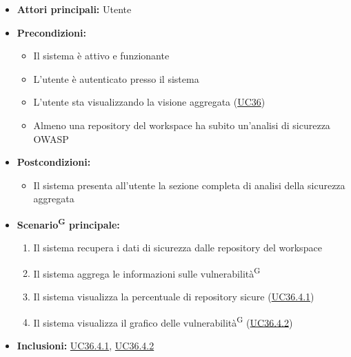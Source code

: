 \documentclass[a4paper, 11pt]{article}
\begin{document}
\begin{itemize}
    \item \textbf{Attori principali:} Utente
    \item \textbf{Precondizioni:}
    \begin{itemize}
        \item Il sistema è attivo e funzionante
        \item L'utente è autenticato presso il sistema
        \item L'utente sta visualizzando la visione aggregata (\hyperref[UC36]{UC36})
        \item Almeno una repository del workspace ha subito un'analisi di sicurezza OWASP
    \end{itemize}
    \item \textbf{Postcondizioni:}
    \begin{itemize}
        \item Il sistema presenta all'utente la sezione completa di analisi della sicurezza aggregata
    \end{itemize}
    \item \textbf{Scenario\textsuperscript{G} principale:}
    \begin{enumerate}
        \item Il sistema recupera i dati di sicurezza dalle repository del workspace
        \item Il sistema aggrega le informazioni sulle vulnerabilità\textsuperscript{G}
        \item Il sistema visualizza la percentuale di repository sicure (\hyperref[UC36.4.1]{UC36.4.1})
        \item Il sistema visualizza il grafico delle vulnerabilità\textsuperscript{G} (\hyperref[UC36.4.2]{UC36.4.2})
    \end{enumerate}
    \item \textbf{Inclusioni:} \hyperref[UC36.4.1]{UC36.4.1}, \hyperref[UC36.4.2]{UC36.4.2}
\end{itemize}
\end{document}
